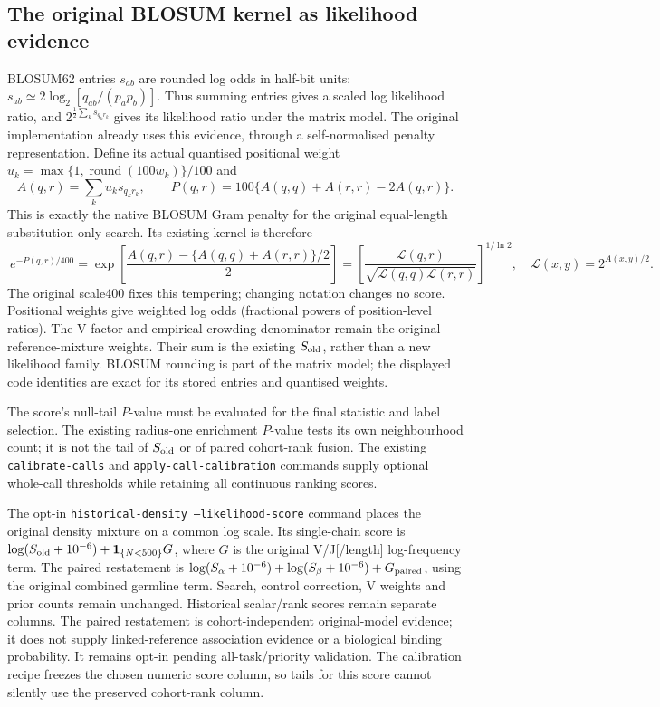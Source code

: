 \documentclass[10pt,a4paper]{article}
\theoremstyle{definition}
\newcommand{\code}[1]{\texttt{\small #1}}
\begin{document}
\subsection{The original BLOSUM kernel as likelihood evidence}
BLOSUM62 entries $s_{ab}$ are rounded log odds in half-bit units:
$s_{ab}\simeq 2\log_2[q_{ab}/(p_ap_b)]$.
Thus summing entries gives a scaled log likelihood ratio, and
$2^{\frac12\sum_k s_{q_kr_k}}$ gives its likelihood ratio under the matrix model.
The original implementation already uses this evidence, through a self-normalised
penalty representation. Define its actual quantised positional weight
$u_k=\max\{1,\operatorname{round}(100w_k)\}/100$ and
\[
 A(q,r)=\sum_k u_k s_{q_kr_k},\qquad
 P(q,r)=100\{A(q,q)+A(r,r)-2A(q,r)\}.
\]
This is exactly the native BLOSUM Gram penalty for the original equal-length
substitution-only search. Its existing kernel is therefore
\[
 \boxed{\ e^{-P(q,r)/400}
 =\exp\!\left[\frac{A(q,r)-\{A(q,q)+A(r,r)\}/2}{2}\right]
 =\left[\frac{\mathcal L(q,r)}
 {\sqrt{\mathcal L(q,q)\mathcal L(r,r)}}\right]^{1/\ln 2},\quad
 \mathcal L(x,y)=2^{A(x,y)/2}.\ }
\]
The original scale400 fixes this tempering; changing notation changes no score.
Positional weights give weighted log odds (fractional powers of position-level ratios).
The V factor and empirical crowding denominator remain the original reference-mixture
weights. Their sum is the existing $S_{\rm old}$, rather than a new likelihood family.
BLOSUM rounding is part of the matrix model; the displayed code identities are exact
for its stored entries and quantised weights.

The score's null-tail $P$-value must be evaluated for the final statistic and label
selection. The existing radius-one enrichment $P$-value tests its own neighbourhood
count; it is not the tail of $S_{\rm old}$ or of paired cohort-rank fusion.
The existing \code{calibrate-calls} and \code{apply-call-calibration} commands supply
optional whole-call thresholds while retaining all continuous ranking scores.

The opt-in \code{historical-density --likelihood-score} command places the
original density mixture on a common log scale. Its single-chain score is
$\log(S_{\rm old}+10^{-6})+\mathbf 1_{\{N<500\}}G$, where $G$ is the original
V/J[/length] log-frequency term. The paired restatement is
$\log(S_\alpha+10^{-6})+\log(S_\beta+10^{-6})+G_{\rm paired}$, using the
original combined germline term. Search, control correction, V weights and
prior counts remain unchanged. Historical scalar/rank scores remain separate
columns. The paired restatement is cohort-independent original-model evidence;
it does not supply linked-reference association evidence or a biological
binding probability. It remains opt-in pending all-task/priority validation.
The calibration recipe freezes the chosen numeric score column, so tails
for this score cannot silently use the preserved cohort-rank column.
\end{document}
